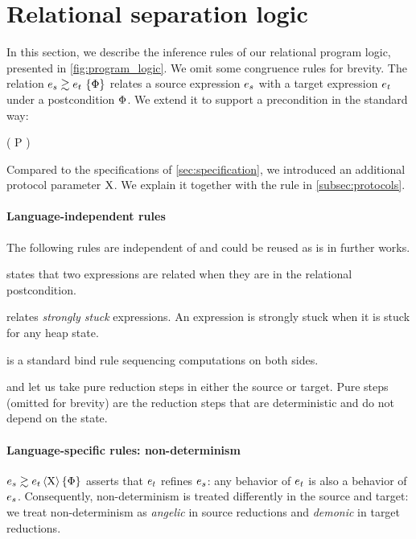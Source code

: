 \section{Relational separation logic}
\label{sec:program_logic}



In this section, we describe the inference rules of our relational program logic, presented in \cref{fig:program_logic}.
We omit some congruence rules for brevity.
The relation $\iSimv{\iPred}{\datalangExpr_s}{\datalangExpr_t}$ relates a source expression $\datalangExpr_s$ with a target expression $\datalangExpr_t$ under a postcondition $\Phi$.
We extend it to support a precondition in the standard way:
\begin{mathline}
    \coloneqq
    \iPersistent \left( P \iWand {} \right)
\end{mathline}

Compared to the specifications of \cref{sec:specification}, we introduced an additional protocol parameter $\mathrm{X}$.
We explain it together with the  rule in \cref{subsec:protocols}.

\paragraph{Language-independent rules}
The following rules are independent of \DataLang and could be reused as is in further works.

 states that two expressions are related when they are in the relational postcondition.

 relates \emph{strongly stuck} expressions.
An expression is strongly stuck when it is stuck for any heap state.

 is a standard bind rule sequencing computations on both sides.

 and  let us take pure reduction steps in either the source or target.
Pure steps (omitted for brevity) are the reduction steps that are deterministic and do not depend on the state.

\paragraph{Language-specific rules: non-determinism}
$\iSimv[\iProt]{\iPred}{\datalangExpr_s}{\datalangExpr_t}$ asserts that $\datalangExpr_t$ refines $\datalangExpr_s$: any behavior of $\datalangExpr_t$ is also a behavior of $\datalangExpr_s$.
Consequently, non-determinism is treated differently in the source and target: we treat non-determinism as \emph{angelic} in source reductions and \emph{demonic} in target reductions.

